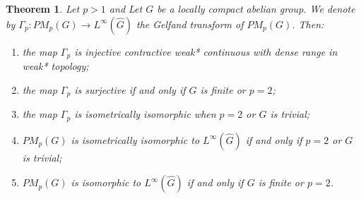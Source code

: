 \documentclass[reqno,11pt]{amsart}
\theoremstyle{plain}
\newtheorem{thm}{Theorem}[section]
\theoremstyle{definition}
\theoremstyle{remark}
\begin{document}
\begin{thm}\label{G}
Let $p>1$ and Let $G$ be a locally compact abelian group. We denote by $\Gamma_p:PM_p(G)\rightarrow L^\infty(\hat{G})$ the Gelfand transform of $PM_p(G)$. Then:
\begin{enumerate}
\item [(i)] the map $\Gamma_p$ is injective contractive weak* continuous with dense range in weak* topology;
\item [(ii)] the map $\Gamma_p$ is surjective if and only if $G$ is finite or $p=2$;
\item [(iii)] the map $\Gamma_p$ is isometrically isomorphic when $p=2$ or $G$ is trivial;
\item [(iv)] $PM_p(G)$ is isometrically isomorphic to $L^\infty(\hat{G})$ if and only if $p=2$ or $G$ is trivial;
\item [(v)] $PM_p(G)$ is isomorphic to $L^\infty(\hat{G})$ if and only if $G$ is finite or $p=2$.
\end{enumerate}
%
%
%
%
%
\end{thm}
\end{document}
